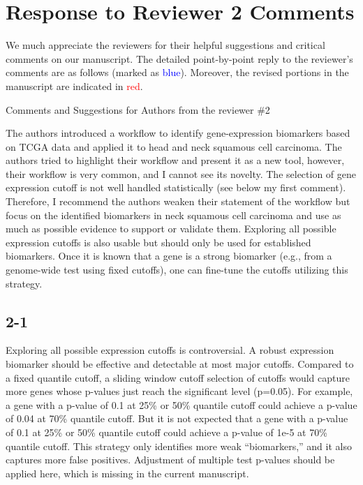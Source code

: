 \documentclass[preprint,12pt]{elsarticle}
\begin{document}
\section*{Response to Reviewer 2 Comments}
We much appreciate the reviewers for their helpful suggestions and critical comments on our manuscript. The detailed point-by-point reply to the reviewer's comments are as follows (marked as \textcolor{blue}{blue}). 
Moreover, the revised portions in the manuscript are indicated in \textcolor{red}{red}.

Comments and Suggestions for Authors from the reviewer \#2 %

The authors introduced a workflow to identify gene-expression biomarkers based on TCGA data and applied it to head and neck squamous cell carcinoma. The authors tried to highlight their workflow and present it as a new tool, however, their workflow is very common, and I cannot see its novelty. 
The selection of gene expression cutoff is not well handled statistically (see below my first comment). %
Therefore, I recommend the authors weaken their statement of the workflow but focus on the identified biomarkers in neck squamous cell carcinoma and use as much as possible evidence to support or validate them. %
Exploring all possible expression cutoffs is also usable but should only be used for established biomarkers. Once it is known that a gene is a strong biomarker (e.g., from a genome-wide test using fixed cutoffs), one can fine-tune the cutoffs utilizing this strategy. %


\subsection*{2-1}%
Exploring all possible expression cutoffs is controversial. 
A robust expression biomarker should be effective and detectable at most major cutoffs. Compared to a fixed quantile cutoff, a sliding window cutoff selection of cutoffs would capture more genes whose p-values just reach the significant level (p=0.05). 
For example, a gene with a p-value of 0.1 at 25\% or 50\% quantile cutoff could achieve a p-value of 0.04 at 70\% quantile cutoff. %
But it is not expected that a gene with a p-value of 0.1 at 25\% or 50\% quantile cutoff could achieve a p-value of 1e-5 at 70\% quantile cutoff. %
This strategy only identifies more weak “biomarkers,” and it also captures more false positives. %
Adjustment of multiple test p-values should be applied here, which is missing in the current manuscript.
\end{document}
